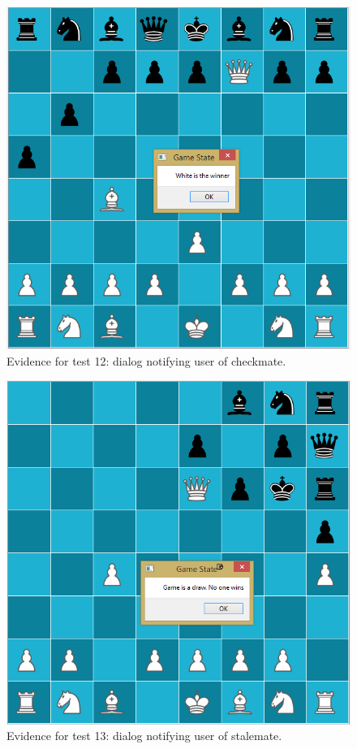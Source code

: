 \begin{figure}
	\centering
	\includegraphics[width=1.0\textwidth]{images/screenshots/test-12}
	\caption{Evidence for test 12: dialog notifying user of checkmate.}
	\label{test-12}
\end{figure}
\begin{figure}
	\centering
	\includegraphics[width=1.0\textwidth]{images/screenshots/test-13}
	\caption{Evidence for test 13: dialog notifying user of stalemate.}
	\label{test-13}
\end{figure}
